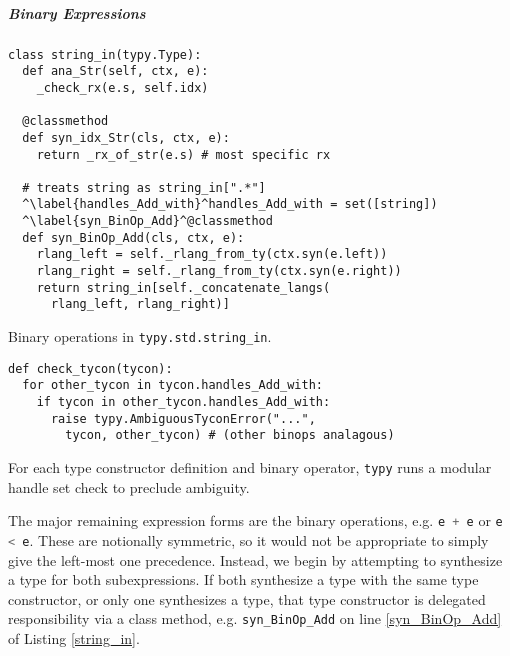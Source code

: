 \documentclass[preprint,10pt]{sigplanconf}
\newcommand{\lip}[1]{\lstinline[language=Python,basicstyle=\ttfamily\small,deletendkeywords={tuple,buffer,map}]{#1}}
\begin{document}
\subparagraph{Binary Expressions} \begin{codelisting}[t]
\begin{lstlisting}
class string_in(typy.Type):
  def ana_Str(self, ctx, e):
    _check_rx(e.s, self.idx)

  @classmethod
  def syn_idx_Str(cls, ctx, e):
    return _rx_of_str(e.s) # most specific rx

  # treats string as string_in[".*"]
  ^\label{handles_Add_with}^handles_Add_with = set([string]) 
  ^\label{syn_BinOp_Add}^@classmethod
  def syn_BinOp_Add(cls, ctx, e): 
    rlang_left = self._rlang_from_ty(ctx.syn(e.left)) 
    rlang_right = self._rlang_from_ty(ctx.syn(e.right))
    return string_in[self._concatenate_langs(
      rlang_left, rlang_right)]
\end{lstlisting}
\caption{Binary operations in \texttt{typy.std.string\_in}.}
\label{string_in}
\end{codelisting}
\begin{codelisting}[t]
\begin{lstlisting}
def check_tycon(tycon):
  for other_tycon in tycon.handles_Add_with: 
    if tycon in other_tycon.handles_Add_with:
      raise typy.AmbiguousTyconError("...", 
        tycon, other_tycon) # (other binops analagous)
\end{lstlisting}
\caption{For each type constructor definition and binary operator, \texttt{typy} runs a modular handle set check to preclude ambiguity.}
\label{check_tycon}
\end{codelisting}
The major remaining expression forms are the binary operations, e.g. \lip{e + e} or \lip{e < e}. These are notionally symmetric, so it would not be appropriate to simply give the left-most one precedence. Instead, we begin by attempting to synthesize a type for both subexpressions. If both synthesize a type with the same type constructor, or only one synthesizes a type, that type constructor is delegated responsibility via a class method, e.g. \lip{syn_BinOp_Add} on line \ref{syn_BinOp_Add} of Listing \ref{string_in}. 
\end{document}
